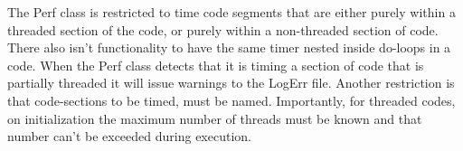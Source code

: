 %



The Perf class is restricted to time code segments that are either
purely within a threaded section of the code, or purely within a
non-threaded section of code. There also isn't functionality to
have the same timer nested inside do-loops in a code. When the Perf
class detects that it is timing a section of code that is partially
threaded it will issue warnings to the LogErr file. Another restriction
is that code-sections to be timed, must be named. Importantly, for
threaded codes, on initialization the maximum number of threads must
be known and that number can't be exceeded during execution.
